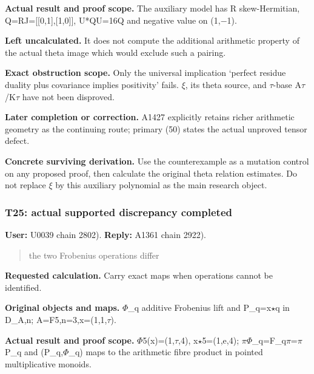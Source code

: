 \textbf{Actual result and proof scope.} The auxiliary model has R
skew-Hermitian, Q=RJ={[}{[}0,1{]},{[}1,0{]}{]}, U*QU=16Q and negative
value on (1,\allowbreak{}\ensuremath{−}\allowbreak{}1).

\textbf{Left uncalculated.} It does not compute the additional
arithmetic property of the actual theta image which would exclude such a
pairing.

\textbf{Exact obstruction scope.} Only the universal implication
`perfect residue duality plus covariance implies positivity' fails.
\allowbreak{}\ensuremath{ξ}\allowbreak{}, its theta source, and
\allowbreak{}\ensuremath{τ}\allowbreak{}-base
A\allowbreak{}\ensuremath{τ}\allowbreak{}/K\allowbreak{}\ensuremath{τ}\allowbreak{}
have not been disproved.

\textbf{Later completion or correction.} A1427 explicitly retains richer
arithmetic geometry as the continuing route; primary (50) states the
actual unproved tensor defect.

\textbf{Concrete surviving derivation.} Use the counterexample as a
mutation control on any proposed proof, then calculate the original
theta relation estimates. Do not replace
\allowbreak{}\ensuremath{ξ}\allowbreak{} by this auxiliary polynomial as
the main research object.

\subsubsection{T25: actual supported discrepancy
completed}\label{TranscriptLedgerStage:t25-actual-supported-discrepancy-completed}

\textbf{User:} U0039
\protect{} chain 2802).
\textbf{Reply:} A1361
\protect{} chain 2922).

\begin{quote}
the two Frobenius operations differ
\end{quote}

\textbf{Requested calculation.} Carry exact maps when operations cannot
be identified.

\textbf{Original objects and maps.}
\allowbreak{}\ensuremath{Φ}\allowbreak{}\_q additive Frobenius lift and
P\_q=x\allowbreak{}\ensuremath{⋆}\allowbreak{}q in D\_A,n;
A=F5,n=3,x=(1,1,\allowbreak{}\ensuremath{τ}\allowbreak{}).

\textbf{Actual result and proof scope.}
\allowbreak{}\ensuremath{Φ}\allowbreak{}5(x)=(1,\allowbreak{}\ensuremath{τ}\allowbreak{},4),
x\allowbreak{}\ensuremath{⋆}\allowbreak{}5=(1,e,4);
\allowbreak{}\ensuremath{π}\allowbreak{}\allowbreak{}\ensuremath{Φ}\allowbreak{}\_q=F\_q\allowbreak{}\ensuremath{π}\allowbreak{}=\allowbreak{}\ensuremath{π}\allowbreak{}P\_q
and (P\_q,\allowbreak{}\ensuremath{Φ}\allowbreak{}\_q) maps to the
arithmetic fibre product in pointed multiplicative monoids.

